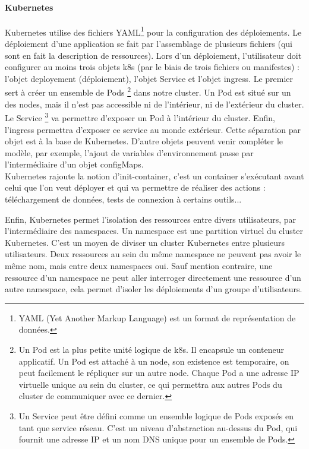 \documentclass[11pt,fleqn]{book} %
\begin{document}
\paragraph{Kubernetes}
Kubernetes utilise des fichiers YAML\footnote{YAML (Yet Another Markup Language) est un format de représentation de données.} pour la configuration des déploiements. Le déploiement d'une application se fait par l'assemblage de plusieurs fichiers (qui sont en fait la description de ressources). Lors d'un déploiement, l'utilisateur doit configurer au moins trois objets k8s (par le biais de trois fichiers ou manifestes) : l'objet deployement (déploiement), l'objet Service et l'objet ingress. Le premier sert à créer un ensemble de Pods \footnote{Un Pod est la plus petite unité logique de k8s. Il encapsule un conteneur applicatif. Un Pod est attaché à un node, son existence est temporaire, on peut facilement le répliquer sur un autre node. Chaque Pod a une adresse IP virtuelle unique au sein du cluster, ce qui permettra aux autres Pods du cluster de communiquer avec ce dernier.} dans notre cluster. Un Pod est situé sur un des nodes, mais il n'est pas accessible ni de l'intérieur, ni de l'extérieur du cluster. Le Service \footnote{Un Service peut être défini comme un ensemble logique de Pods exposés en tant que service réseau. C'est un niveau d'abstraction au-dessus du Pod, qui fournit une adresse IP et un nom DNS unique pour un ensemble de Pods.} va permettre d'exposer un Pod à l'intérieur du cluster. Enfin, l'ingress permettra d'exposer ce service au monde extérieur. Cette séparation par objet est à la base de Kubernetes. D'autre objets peuvent venir compléter le modèle, par exemple, l'ajout de variables d'environnement passe par l'intermédiaire d'un objet configMaps.\\

Kubernetes rajoute la notion d'init-container, c'est un container s'exécutant avant celui que l'on veut déployer et qui va permettre de réaliser des actions : téléchargement de données, tests de connexion à certains outils... \newline


Enfin, Kubernetes permet l'isolation des ressources entre divers utilisateurs, par l'intermédiaire des namespaces. Un namespace est une partition virtuel du cluster Kubernetes. C’est un moyen de diviser un cluster Kubernetes entre plusieurs utilisateurs. Deux ressources au sein du même namespace ne peuvent pas avoir le même nom, mais entre deux namespaces oui. Sauf mention contraire, une ressource d’un namespace ne peut aller interroger directement une ressource d’un autre namespace, cela permet d’isoler les déploiements d’un groupe d’utilisateurs.
\end{document}
